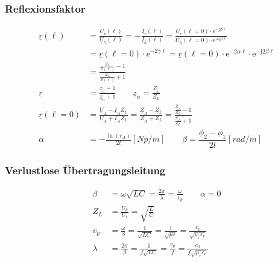 \subsubsection{Reflexionsfaktor}
\begin{align*}
    \underline{r}(\ell)     & = \frac{\underline{U}_r(\ell)}{\underline{U}_h(\ell)} = -\frac{\underline{I}_r(\ell)}{\underline{I}_h(\ell)} = \frac{\underline{U}_r(\ell=0) \cdot \mathrm{e}^{-\mathrm{j} \beta \ell}}{\underline{U}_h(\ell=0) \cdot \mathrm{e}^{+\mathrm{j} \beta \ell}} \\
                            & = \underline{r}(\ell=0) \cdot \mathrm{e}^{-2 \underline{\gamma} \ell}=\underline{r}(\ell=0) \cdot \mathrm{e}^{-2 \alpha \ell} \cdot \mathrm{e}^{-\mathrm{j} 2 \beta \ell}\\
                            & = \frac{\frac{Z_L}{\underline{Z}(\ell)}-1}{\frac{Z_L}{\underline{Z}(\ell)}+1} \\
    \underline{r}           & = \frac{\underline{z}_n-1}{\underline{z}_n+1} \qquad              \underline{z}_n=\frac{\underline{Z}_n}{Z_L}\\
    \underline{r}(\ell = 0) & = \frac{\underline{U}_A-\underline{I}_A Z_L}{\underline{U}_A + \underline{I}_A Z_L}=\frac{\underline{Z}_A-Z_L}{\underline{Z}_A+Z_L}=\frac{\frac{\underline{Z}_A}{Z_L}-1}{\frac{\underline{Z}_A}{Z_L}+1}\\
                    \alpha  & = -\frac{\ln(r_A)}{2l} [\si{Np/m}]  \qquad  \beta = \dfrac{\phi_2 -\phi_1}{2l} [\si{rad/m}]
\end{align*}

\subsubsection{Verlustlose Übertragungsleitung }
\begin{align*}
    \beta              & = \omega\sqrt{LC} = \frac{2 \pi}{\lambda} = \frac{\omega}{v_p}\qquad \alpha = 0 \\
    Z_L                & =\frac{U_h}{U_r}       = \sqrt{\frac{L}{C}}                                                                          \\
    v_p                & = \frac{\omega}{\beta} = \frac{1}{\sqrt{LC}}= \frac{1}{\sqrt{\mu\varepsilon}}= \frac{c_0}{\sqrt{\mu_r\varepsilon_r}} \\
    \lambda            & = \frac{2\pi}{\beta}=\frac{1}{f\sqrt{LC}}= \frac{v_p}{f}= \frac{c_0}{f\sqrt{\mu_r\varepsilon_r}}
\end{align*}


